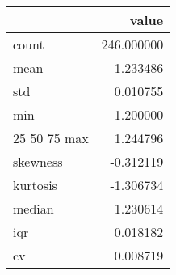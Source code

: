 \begin{tabular}{lr}
\toprule
 & value \\
\midrule
count & 246.000000 \\
mean & 1.233486 \\
std & 0.010755 \\
min & 1.200000 \\
25%
50%
75%
max & 1.244796 \\
skewness & -0.312119 \\
kurtosis & -1.306734 \\
median & 1.230614 \\
iqr & 0.018182 \\
cv & 0.008719 \\
\bottomrule
\end{tabular}

